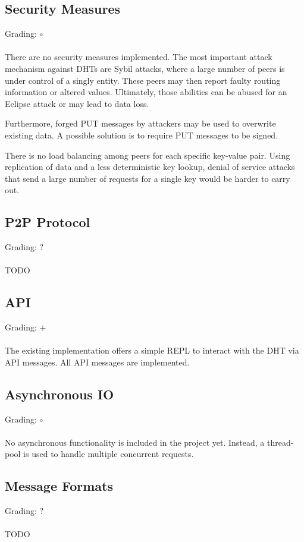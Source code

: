 \documentclass[a4paper, 11pt]{article}
\begin{document}
\subsection*{Security Measures}
Grading: $\circ$\\
\\
There are no security measures implemented.
The most important attack mechanism against DHTs are Sybil attacks, where a large number of peers is under control of a singly entity. 
These peers may then report faulty routing information or altered values. 
Ultimately, those abilities can be abused for an Eclipse attack or may lead to data loss.

Furthermore, forged PUT messages by attackers may be used to overwrite existing data.
A possible solution is to require PUT messages to be signed.

There is no load balancing among peers for each specific key-value pair. 
Using replication of data and a less deterministic key lookup, denial of service attacks that send a large number of requests for a single key would be harder to carry out.

\subsection*{P2P Protocol}
Grading: $?$\\
\\
TODO


\subsection*{API}
Grading: $+$\\
\\
The existing implementation offers a simple REPL to interact with the DHT via API messages.
All API messages are implemented.

\subsection*{Asynchronous IO}
Grading: $\circ$\\
\\
No asynchronous functionality is included in the project yet.
Instead, a thread-pool is used to handle multiple concurrent requests.


\subsection*{Message Formats}
Grading: $?$\\
\\
TODO
\end{document}
